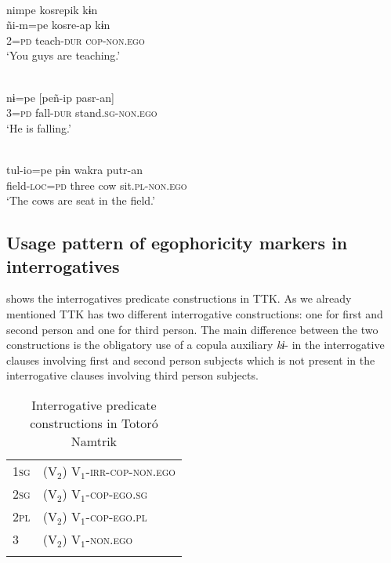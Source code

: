 \documentclass[output=paper]{langsci/langscibook}
\begin{document}
\ea \label{ex:gg42}
\\
    \glll  nimpe	kosrepik	kɨn\\
    ñi-m=pe	kosre-ap kɨn\\
         2=\textsc{pd}	teach-\textsc{dur} \textsc{cop-non.ego}\\
    \glt ‘You guys are teaching.'
\z


\ea \label{ex:gg43}
\\
    \gll nɨ=pe	[peñ-ip	pasr-an]\\
         3=\textsc{pd}	fall-\textsc{dur}	stand.\textsc{sg-non.ego}\\
    \glt ‘He ‎‎is falling.'
\z


\ea \label{ex:gg44}
\\
    \gll tul-io=pe	pɨn	wakra	putr-an\\
         field-\textsc{loc=pd}	three	cow	sit.\textsc{pl-non.ego}\\
    \glt ‘The cows are seat in the field.'
\z


\subsection{Usage pattern of egophoricity markers in interrogatives}\label{s:gg3-2}

 shows the interrogatives predicate constructions in TTK. As we already mentioned TTK has two different interrogative constructions: one for first and second person and one for third person. The main difference between the two constructions is the obligatory use of a copula auxiliary \textit{kɨ}- in the interrogative clauses involving first and second person subjects which is not present in the interrogative clauses involving third person subjects.

\begin{table}
\begin{tabularx}{.8\textwidth}{Xl}
\lsptoprule
\textsc{1sg} & (V$_2$) V$_1$-\textsc{irr-cop-non.ego}\\
\textsc{2sg} & (V$_2$) V$_1$-\textsc{cop-ego.sg}\\
\textsc{2pl} & (V$_2$) V$_1$-\textsc{cop-ego.pl}\\
\textsc{3} & (V$_2$) V$_1$-\textsc{non.ego}\\
\lspbottomrule
\end{tabularx}
\caption{Interrogative predicate constructions in Totoró Namtrik}
\label{tab:gg9}
\end{table}
\end{document}
